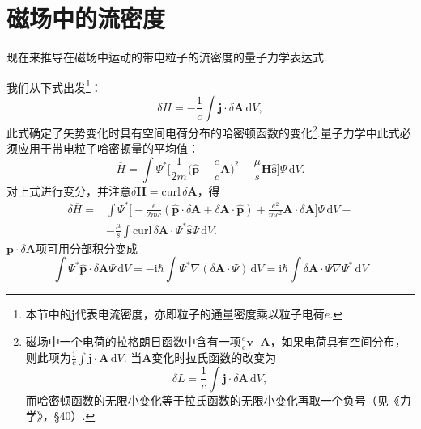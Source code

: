 \section{磁场中的流密度}

现在来推导在磁场中运动的带电粒子的流密度的量子力学表达式.

我们从下式出发\footnote{本节中的$\boldsymbol{j}$代表电流密度，亦即粒子的通量密度乘以粒子电荷$e$.}：
\begin{equation}
  \delta H=-\frac{1}{c}\int\boldsymbol{j}\cdot\delta\boldsymbol{A}\,\mathrm{d}V,
\end{equation}
此式确定了矢势变化时具有空间电荷分布的哈密顿函数的变化\footnote{磁场中一个电荷的拉格朗日函数中含有一项$\frac{e}{c}\boldsymbol{v}\cdot\boldsymbol{A}$，如果电荷具有空间分布，则此项为$\frac{1}{c}\int\boldsymbol{j}\cdot\boldsymbol{A}\,\mathrm{d}V$.
当$\boldsymbol{A}$变化时拉氏函数的改变为
\begin{equation*}
  \delta L=\frac{1}{c}\int\boldsymbol{j}\cdot\delta\boldsymbol{A}\,\mathrm{d}V,
\end{equation*}
而哈密顿函数的无限小变化等于拉氏函数的无限小变化再取一个负号（见《力学》，§40）.}.量子力学中此式必须应用于带电粒子哈密顿量的平均值：
\begin{equation}
  \overline{H}=\int\varPsi^{*}\biggl[\frac{1}{2m}
  \biggl(\hat{\boldsymbol{p}}-\frac{e}{c}\boldsymbol{A}\biggr)^2
  -\frac{\mu}{s}\boldsymbol{H}\hat{\boldsymbol{s}}\biggr]\varPsi\,\mathrm{d}V.
\end{equation}
对上式进行变分，并注意$\delta\boldsymbol{H}=\mathrm{curl}\,\delta\boldsymbol{A}$，得
\begin{equation}
\begin{aligned}
  \delta\overline{H}={}&\int\varPsi^{*}\biggl[-\frac{e}{2mc}
  (\hat{\boldsymbol{p}}\cdot\delta\boldsymbol{A}+\delta\boldsymbol{A}\cdot\hat{\boldsymbol{p}})
  +\frac{e^2}{mc^2}\boldsymbol{A}\cdot\delta\boldsymbol{A}\biggr]\varPsi\,\mathrm{d}V-\\
  &-\frac{\mu}{s}\int\mathrm{curl}\,\delta\boldsymbol{A}\cdot
  \varPsi^{*}\hat{\boldsymbol{s}}\varPsi\,\mathrm{d}V.
\end{aligned}
\end{equation}
$\boldsymbol{p}\cdot\delta\boldsymbol{A}$项可用分部积分变成
\begin{equation*}
  \int\varPsi^{*}\hat{\boldsymbol{p}}\cdot\delta\boldsymbol{A}\varPsi\,\mathrm{d}V
  =-\mathrm{i}\hbar\int\varPsi^{*}\nabla(\delta\boldsymbol{A}\cdot\varPsi)\,\mathrm{d}V
  =\mathrm{i}\hbar\int\delta\boldsymbol{A}\cdot\varPsi\nabla\varPsi^{*}\,\mathrm{d}V
\end{equation*}
